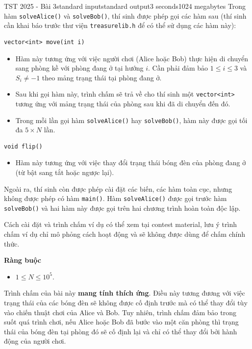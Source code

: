 \begin{problem}{TST 2025 - Bài 3}{standard input}{standard output}{3 seconds}{1024 megabytes}
Trong hàm \texttt{solveAlice()} và \texttt{solveBob()}, thí sinh được phép gọi các hàm sau (thí sinh cần khai báo trước thư viện \texttt{treasurelib.h} để có thể sử dụng các hàm này):

\begin{lstlisting}
vector<int> move(int i)
\end{lstlisting}

\begin{itemize}
   \item Hàm này tương ứng với việc người chơi (Alice hoặc Bob) thực hiện di chuyển sang phòng kề với phòng đang ở tại hướng $i$. Cần phải đảm bảo $1\le i\le 3$ và $S_i\ne -1$ theo mảng trạng thái tại phòng đang ở.
   \item Sau khi gọi hàm này, trình chấm sẽ trả về cho thí sinh một \texttt{vector<int>} tương ứng với mảng trạng thái của phòng sau khi đã di chuyển đến đó.
   \item Trong mỗi lần gọi hàm \texttt{solveAlice()} hay \texttt{solveBob()}, hàm này được gọi tối đa $5\times N$ lần.
\end{itemize}

\begin{lstlisting}
void flip()
\end{lstlisting}

\begin{itemize}
   \item Hàm này tương ứng với việc thay đổi trạng thái bóng đèn của phòng đang ở (từ bật sang tắt hoặc ngược lại).
\end{itemize}

Ngoài ra, thí sinh còn được phép cài đặt các biến, các hàm toàn cục, nhưng không được phép có hàm \texttt{main()}. Hàm \texttt{solveAlice()} được gọi trước hàm \texttt{solveBob()} và hai hàm này được gọi trên hai chương trình hoàn toàn độc lập.

Cách cài đặt và trình chấm ví dụ có thể xem tại contest material, lưu ý trình chấm ví dụ chỉ mô phỏng cách hoạt động và sẽ không được dùng để chấm chính thức.

\textbf{Ràng buộc}

\begin{itemize}
   \item $1\le N\le 10^5$.
\end{itemize}

Trình chấm của bài này \textbf{mang tính thích ứng}. Điều này tương đương với việc trạng thái của các bóng đèn sẽ không được cố định trước mà có thể thay đổi tùy vào chiến thuật chơi của Alice và Bob. Tuy nhiên, trình chấm đảm bảo trong suốt quá trình chơi, nếu Alice hoặc Bob đã bước vào một căn phòng thì trạng thái của bóng đèn tại phòng đó sẽ cố định lại và chỉ có thể thay đổi bởi hành động của người chơi.


\end{problem}
